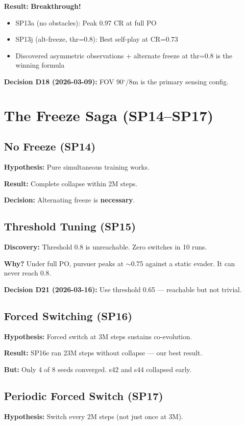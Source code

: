 \documentclass[11pt,a4paper]{report}
\begin{document}
\textbf{Result:} \textbf{Breakthrough!}
\begin{itemize}
    \item SP13a (no obstacles): Peak 0.97 CR at full PO
    \item SP13j (alt-freeze, thr=0.8): Best self-play at CR=0.73
    \item Discovered asymmetric observations + alternate freeze at thr=0.8 is the winning formula
\end{itemize}

\textbf{Decision D18 (2026-03-09):} FOV 90$^\circ$/8m is the primary sensing config.

\section{The Freeze Saga (SP14--SP17)}

\subsection{No Freeze (SP14)}
\textbf{Hypothesis:} Pure simultaneous training works.

\textbf{Result:} Complete collapse within 2M steps.

\textbf{Decision:} Alternating freeze is \textbf{necessary}.

\subsection{Threshold Tuning (SP15)}
\textbf{Discovery:} Threshold 0.8 is unreachable. Zero switches in 10 runs.

\textbf{Why?} Under full PO, pursuer peaks at $\sim$0.75 against a static evader. It can never reach 0.8.

\textbf{Decision D21 (2026-03-16):} Use threshold 0.65 --- reachable but not trivial.

\subsection{Forced Switching (SP16)}
\textbf{Hypothesis:} Forced switch at 3M steps sustains co-evolution.

\textbf{Result:} SP16e ran 23M steps without collapse --- our best result.

\textbf{But:} Only 4 of 8 seeds converged. s42 and s44 collapsed early.

\subsection{Periodic Forced Switch (SP17)}
\textbf{Hypothesis:} Switch every 2M steps (not just once at 3M).
\end{document}
